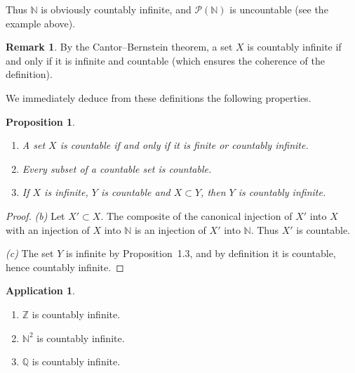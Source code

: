 \documentclass[11pt]{article}
\newtheorem{proposition}{Proposition}[section]
\theoremstyle{definition}
\newtheorem{remark}{Remark}[section]
\newtheorem{application}{Application}[section]
\begin{document}
Thus $\mathbb N$ is obviously countably infinite, and $\mathcal P(\mathbb N)$ is uncountable (see the example above).

\begin{remark}
By the Cantor--Bernstein theorem, a set $X$ is countably infinite if and only if it is infinite and countable (which ensures the coherence of the definition).
\end{remark}

We immediately deduce from these definitions the following properties.

\begin{proposition}
\begin{enumerate}[label=(\alph*),leftmargin=2em]
\item A set $X$ is countable if and only if it is finite or countably infinite.
\item Every subset of a countable set is countable.
\item If $X$ is infinite, $Y$ is countable and $X\subset Y$, then $Y$ is countably infinite.
\end{enumerate}
\end{proposition}

\begin{proof}
\emph{(b)} Let $X'\subset X$.
The composite of the canonical injection of $X'$ into $X$ with an injection of $X$ into $\mathbb N$ is an injection of $X'$ into $\mathbb N$.
Thus $X'$ is countable.

\emph{(c)} The set $Y$ is infinite by Proposition~1.3, and by definition it is countable, hence countably infinite.
\end{proof}

\begin{application}
\begin{enumerate}[label=(\alph*),leftmargin=2em]
\item $\mathbb Z$ is countably infinite.
\item $\mathbb N^2$ is countably infinite.
\item $\mathbb Q$ is countably infinite.
\end{enumerate}
\end{application}
\end{document}
